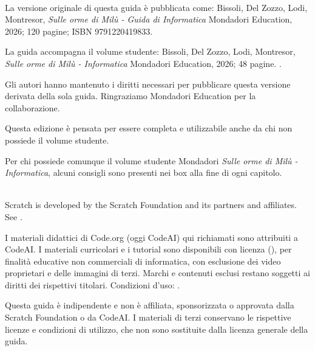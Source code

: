 \documentclass[
  italian,
  11pt,
  fleqn,
  a4paper,
]{LegrandOrangeBook}
\begin{document}
\vspace{14pt}
\\[4pt]
{\footnotesize
\setlength{\parskip}{4pt}
\noindent La versione originale di questa guida è pubblicata come: Bissoli, Del Zozzo, Lodi, Montresor, \textit{Sulle orme di Milù - Guida di Informatica} Mondadori Education, 2026; 120 pagine; ISBN 9791220419833. 

\noindent La guida accompagna il volume studente: Bissoli, Del Zozzo, Lodi, Montresor, \textit{Sulle orme di Milù - Informatica} Mondadori Education, 2026; 48 pagine. .

\noindent Gli autori hanno mantenuto i diritti necessari per pubblicare questa versione derivata della sola guida. Ringraziamo Mondadori Education per la collaborazione.

\noindent Questa edizione è pensata per essere completa e utilizzabile anche da chi non possiede il volume studente.

\noindent Per chi possiede comunque il volume studente Mondadori \textit{Sulle orme di Milù - Informatica}, alcuni consigli sono presenti nei box alla fine di ogni capitolo.

\vspace{4pt}
\\[2pt]
\noindent Scratch is developed by the Scratch Foundation and its partners and affiliates. See .

\noindent I materiali didattici di Code.org (oggi CodeAI) qui richiamati sono attribuiti a CodeAI. I materiali curricolari e i tutorial sono disponibili con licenza  (), per finalità educative non commerciali di informatica, con esclusione dei video proprietari e delle immagini di terzi. Marchi e contenuti esclusi restano soggetti ai diritti dei rispettivi titolari. Condizioni d'uso: .

\noindent Questa guida è indipendente e non è affiliata, sponsorizzata o approvata dalla Scratch Foundation o da CodeAI. I materiali di terzi conservano le rispettive licenze e condizioni di utilizzo, che non sono sostituite dalla licenza generale della guida.

\par}
\end{document}
